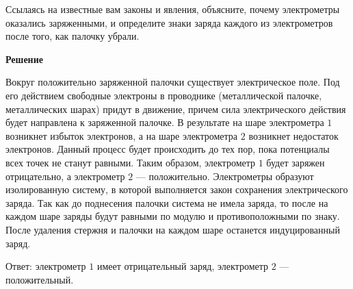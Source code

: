\documentclass[12pt,a4paper]{article}
\begin{document}
{Ссылаясь на известные вам законы и явления, объясните, почему электрометры оказались заряженными, и определите знаки заряда каждого из электрометров после того, как палочку убрали.
}{
\smallskip\noindent\textbf{Решение}\par
Вокруг положительно заряженной палочки существует электрическое поле. Под его действием свободные электроны в проводнике (металлической палочке, металлических шарах) придут в движение, причем сила электрического действия будет направлена к заряженной палочке. В результате на шаре электрометра $1$ возникнет избыток электронов, а на шаре электрометра $2$ возникнет недостаток электронов. Данный процесс будет происходить до тех пор, пока потенциалы всех точек не станут равными. Таким образом, электрометр $1$ будет заряжен отрицательно, а электрометр $2$  — положительно.
Электрометры образуют изолированную систему, в которой выполняется закон сохранения электрического заряда. Так как до поднесения палочки система не имела заряда, то после на каждом шаре заряды будут равными по модулю и противоположными по знаку. После удаления стержня и палочки на каждом шаре останется индуцированный заряд.

Ответ: электрометр $1$ имеет отрицательный заряд, электрометр $2$  — положительный.
}
\end{document}
